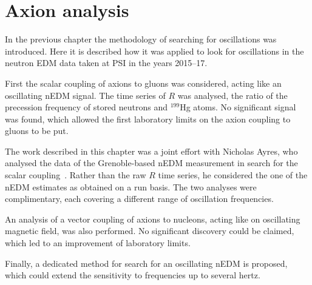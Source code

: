 \chapter{Axion analysis}
\label{ch:axion-analysis}
In the previous chapter the methodology of searching for oscillations was introduced. Here it is described how it was applied to look for oscillations in the neutron EDM data taken at PSI in the years 2015--17.

First the scalar coupling of axions to gluons was considered, acting like an oscillating nEDM signal. The time series of $R$ was analysed, the ratio of the precession frequency of stored neutrons and ${}^{199}$Hg atoms. No significant signal was found, which allowed the first laboratory limits on the axion coupling to gluons to be put.

The work described in this chapter was a joint effort with Nicholas Ayres, who analysed the data of the Grenoble-based nEDM measurement in search for the scalar coupling~\cite{AyresThesis}. Rather than the raw $R$ time series, he considered the one of the nEDM estimates as obtained on a run basis. The two analyses were complimentary, each covering a different range of oscillation frequencies.

An analysis of a vector coupling of axions to nucleons, acting like on oscillating magnetic field, was also performed. No significant discovery could be claimed, which led to an improvement of laboratory limits.

Finally, a dedicated method for search for an oscillating nEDM is proposed, which could extend the sensitivity to frequencies up to several hertz.





